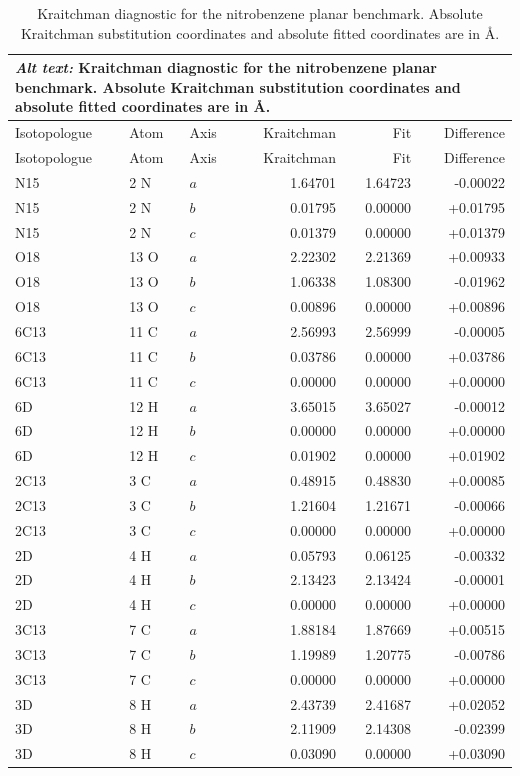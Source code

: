 \documentclass[12pt]{article}
\begin{document}
\begin{longtable}{lllrrr}
\caption{Kraitchman diagnostic for the nitrobenzene planar benchmark. Absolute Kraitchman substitution coordinates and absolute fitted coordinates are in \AA.}\label{tab:si-nitrobenzene-kraitchman}\\
\multicolumn{6}{p{0.98\linewidth}}{\textit{Alt text:} Kraitchman diagnostic for the nitrobenzene planar benchmark. Absolute Kraitchman substitution coordinates and absolute fitted coordinates are in \AA.}\\
\toprule
Isotopologue & Atom & Axis & Kraitchman & Fit & Difference \\
\midrule
\endfirsthead
\toprule
Isotopologue & Atom & Axis & Kraitchman & Fit & Difference \\
\midrule
\endhead
N15 & 2 N & $a$ & 1.64701 & 1.64723 & -0.00022 \\
N15 & 2 N & $b$ & 0.01795 & 0.00000 & +0.01795 \\
N15 & 2 N & $c$ & 0.01379 & 0.00000 & +0.01379 \\
O18 & 13 O & $a$ & 2.22302 & 2.21369 & +0.00933 \\
O18 & 13 O & $b$ & 1.06338 & 1.08300 & -0.01962 \\
O18 & 13 O & $c$ & 0.00896 & 0.00000 & +0.00896 \\
6C13 & 11 C & $a$ & 2.56993 & 2.56999 & -0.00005 \\
6C13 & 11 C & $b$ & 0.03786 & 0.00000 & +0.03786 \\
6C13 & 11 C & $c$ & 0.00000 & 0.00000 & +0.00000 \\
6D & 12 H & $a$ & 3.65015 & 3.65027 & -0.00012 \\
6D & 12 H & $b$ & 0.00000 & 0.00000 & +0.00000 \\
6D & 12 H & $c$ & 0.01902 & 0.00000 & +0.01902 \\
2C13 & 3 C & $a$ & 0.48915 & 0.48830 & +0.00085 \\
2C13 & 3 C & $b$ & 1.21604 & 1.21671 & -0.00066 \\
2C13 & 3 C & $c$ & 0.00000 & 0.00000 & +0.00000 \\
2D & 4 H & $a$ & 0.05793 & 0.06125 & -0.00332 \\
2D & 4 H & $b$ & 2.13423 & 2.13424 & -0.00001 \\
2D & 4 H & $c$ & 0.00000 & 0.00000 & +0.00000 \\
3C13 & 7 C & $a$ & 1.88184 & 1.87669 & +0.00515 \\
3C13 & 7 C & $b$ & 1.19989 & 1.20775 & -0.00786 \\
3C13 & 7 C & $c$ & 0.00000 & 0.00000 & +0.00000 \\
3D & 8 H & $a$ & 2.43739 & 2.41687 & +0.02052 \\
3D & 8 H & $b$ & 2.11909 & 2.14308 & -0.02399 \\
3D & 8 H & $c$ & 0.03090 & 0.00000 & +0.03090 \\
\bottomrule
\end{longtable}
\end{document}

